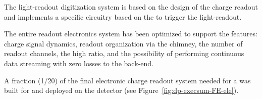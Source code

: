 The light-readout digitization system is %
based on %
the design of the charge readout and %
implements a specific circuitry based on the   to trigger the light-readout. %



The entire readout electronics system has been optimized to support the  features: charge signal dynamics, readout organization via the chimney, the number of readout channels, the high  ratio, and the possibility of performing continuous data streaming with zero losses to the  back-end. 


A fraction (1/20) of the final electronic charge readout system needed for a    was built for  and deployed on the detector (see Figure~\ref{fig:dp-execsum-FE-ele}).  %

